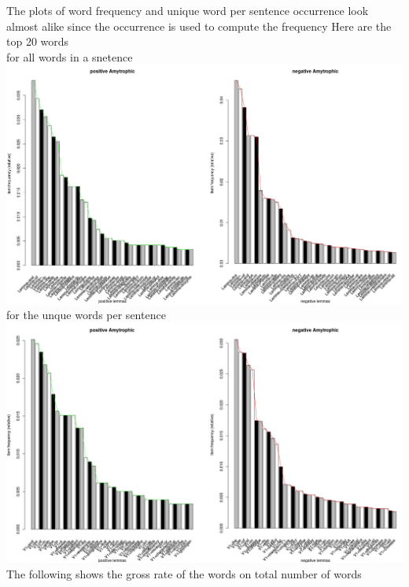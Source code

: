 \documentclass{article}
\begin{document}
The plots of word frequency and unique word per sentence occurrence look almost alike since the occurrence is used to compute the frequency
\newpage
Here are the top 20 words\\
for all words in a snetence\\
\includegraphics[width=1.0\linewidth]{Top_20_lemma.png}\\
for the unque words per sentence\\
\includegraphics[width=1.0\linewidth]{Top_20_lemma_uniq.png}\\
The following shows the gross rate of the words on total number of words \\
\end{document}
